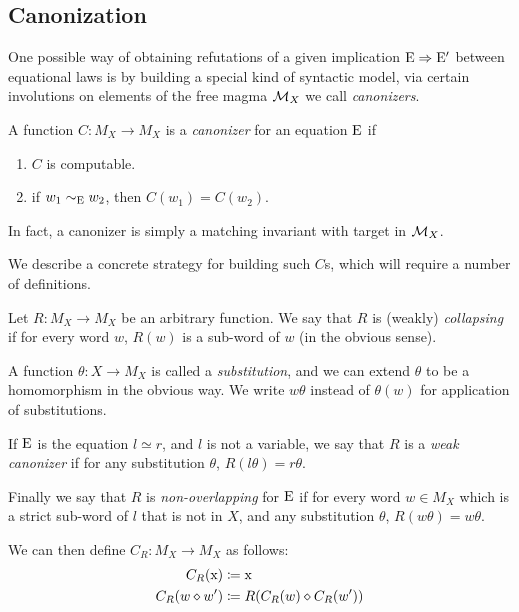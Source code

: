 \subsection{Canonization}\label{canon-sec}

One possible way of obtaining refutations of a given implication $\mathrm{E} \Rightarrow \mathrm{E}'$ between equational laws is by building a special kind of syntactic model, via certain involutions on elements of the free magma ${\mathcal{M}}_X$ we call \emph{canonizers}.

\begin{definition}
  A function $C\colon M_X\rightarrow M_X$ is a \emph{canonizer} for an equation $\mathrm{E}$ if
  \begin{enumerate}
    \item $C$ is computable.
    \item if $w_1\sim_{\mathrm{E}} w_2$, then $C(w_1) = C(w_2)$.
  \end{enumerate}
\end{definition}

In fact, a canonizer is simply a matching invariant with target in ${\mathcal{M}}_X$.

We describe a concrete strategy for building such $C$s, which will require a number of definitions.


\begin{definition}\label{def:canon}
Let $R \colon M_X \to M_X$ be an arbitrary function.
  We say that $R$ is (weakly) \emph{collapsing} if for every word $w$, $R(w)$ is a sub-word of $w$ (in the obvious sense).

  A function $\theta\colon X\rightarrow M_X$ is called a \emph{substitution}, and we can extend $\theta$ to be a homomorphism in the obvious way. We write $w\theta$ instead of $\theta(w)$ for application of substitutions.

  If $\mathrm{E}$ is the equation $l\simeq r$, and $l$ is not a variable, we say that $R$ is a \emph{weak canonizer} if for any substitution $\theta$, $R(l\theta)=r\theta$.

  Finally we say that $R$ is \emph{non-overlapping} for $\mathrm{E}$ if for every word $w\in M_X$ which is a strict sub-word of $l$ that is not in $X$, and any substitution $\theta$, $R(w\theta) = w\theta$.

  We can then define $C_R\colon M_X\rightarrow M_X$ as follows:
\begin{align}
  C_R(\mathrm{x}) &\coloneqq \mathrm{x}\\
  C_R(w\diamond w') &\coloneqq R(C_R(w)\diamond C_R(w'))
\end{align}
\end{definition}


